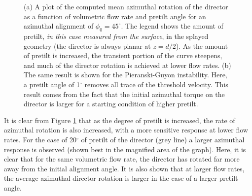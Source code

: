  
\begin{figure}
\begin{center}
\end{center}
\caption[Simulations of applied pretilt on the Pieranski-Guyon instability]{\label{fig:45_vary_tilt} (a) A plot of the computed mean azimuthal rotation of the director as a function of volumetric flow rate and pretilt angle for an azimuthal alignment of $\phi_0=45^{\circ}$. The legend shows the amount of pretilt, \textit{in this case measured from the surface}, in the splayed geometry (the director is always planar at $z=d/2$). As the amount of pretilt is increased, the transient portion of the curve steepens, and much of the director rotation is achieved at lower flow rates. (b) The same result is shown for the Pieranski-Guyon instability. Here, a pretilt angle of 1$^{\circ}$ removes all trace of the threshold velocity. This result comes from the fact that the initial azimuthal torque on the director is larger for a starting condition of higher pretilt.}
\end{figure}

It is clear from Figure \ref{fig:45_vary_tilt} that as the degree of pretilt is increased, the rate of azimuthal rotation is also increased, with a more sensitive response at lower flow rates. For the case of 20$^{\circ}$ of pretilt of the director (grey line) a larger azimuthal response is observed (shown best in the magnified area of the graph). Here, it is clear that for the same volumetric flow rate, the director has rotated far more away from the initial alignment angle. It is also shown that at larger flow rates, the average azimuthal director rotation is larger in the case of a larger pretilt angle.

